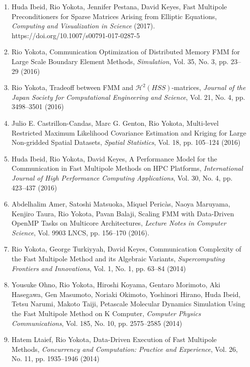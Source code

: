 \documentclass[margin,line]{cv}
\begin{document}
\begin{resume}
\begin{enumerate}
\item Huda Ibeid, Rio Yokota, Jennifer Pestana, David Keyes, Fast Multipole Preconditioners for Sparse Matrices Arising from Elliptic Equations, {\it Computing and Visualization in Science} (2017). https://doi.org/10.1007/s00791-017-0287-5

\item Rio Yokota, Communication Optimization of Distributed Memory FMM for Large Scale Boundary Element Methods, {\it Simulation}, Vol. 35, No. 3, pp. 23--29 (2016)

\item Rio Yokota, Tradeoff between FMM and $\mathcal{H}^2 (HSS)$-matrices, {\it Journal of the Japan Society for Computational Engineering and Science}, Vol. 21, No. 4, pp. 3498--3501 (2016)

\item Julio E. Castrillon-Candas, Marc G. Genton, Rio Yokota, Multi-level Restricted Maximum Likelihood Covariance Estimation and Kriging for Large Non-gridded Spatial Datasets, {\it Spatial Statistics}, Vol. 18, pp. 105--124 (2016)

\item Huda Ibeid, Rio Yokota, David Keyes, A Performance Model for the Communication in Fast Multipole Methods on HPC Platforms, {\it International Journal of High Performance Computing Applications}, Vol. 30, No. 4, pp. 423--437 (2016)

\item Abdelhalim Amer, Satoshi Matsuoka, Miquel Peric\`as, Naoya Maruyama, Kenjiro Taura, Rio Yokota, Pavan Balaji, Scaling FMM with Data-Driven OpenMP Tasks on Multicore Architectures, {\it Lecture Notes in Computer Science}, Vol. 9903 LNCS, pp. 156--170 (2016).

\item Rio Yokota, George Turkiyyah, David Keyes, Communication Complexity of the Fast Multipole Method and its Algebraic Variants, {\it Supercomputing Frontiers and Innovations}, Vol. 1, No. 1, pp. 63--84 (2014)

\item Yousuke Ohno, Rio Yokota, Hiroshi Koyama, Gentaro Morimoto, Aki Hasegawa, Gen Masumoto, Noriaki Okimoto, Yoshinori Hirano, Huda Ibeid, Tetsu Narumi, Makoto Taiji, Petascale Molecular Dynamics Simulation Using the Fast Multipole Method on K Computer, {\it Computer Physics Communications}, Vol. 185, No. 10, pp. 2575--2585 (2014)

\item Hatem Ltaief, Rio Yokota, Data-Driven Execution of Fast Multipole Methods, {\it Concurrency and Computation: Practice and Experience}, Vol. 26, No. 11, pp. 1935--1946 (2014)


\end{enumerate}
\end{resume}
\end{document}
